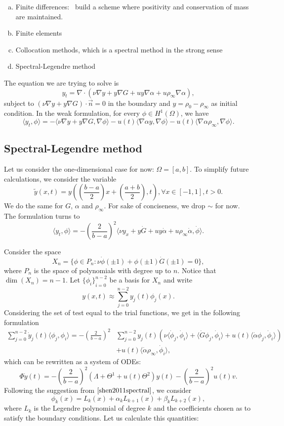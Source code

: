 \documentclass[12pt]{article}
\newcommand{\n}{\vec{n}}
\newcommand{\steady}{\rho_{\infty}}
\newcommand{\inner}[2]{\langle{} #1, #2 \rangle{}}
\theoremstyle{definition}
\begin{document}
\begin{enumerate}[(a)]
    \item Finite differences:~\cite{chang1970practical} build a scheme where positivity and conservation of mass are maintained.
    \item Finite elements
    \item Collocation methods, which is a spectral method in the strong sense
    \item Spectral-Legendre method
\end{enumerate}

The equation we are trying to solve is 
\[
y_t = \nabla \cdot (\nu \nabla y + y \nabla G + u y \nabla \alpha + u \steady \nabla \alpha),
\]
subject to $(\nu \nabla y + y \nabla G) \cdot \n = 0$ in the boundary and $y = \rho_0 - \steady$ as initial condition.
In the weak formulation, for every $\phi \in H^1(\Omega)$, we have
\[
\inner{y_t}{\phi} = -\inner{\nu \nabla y + y \nabla G}{\nabla \phi} - u(t)\inner{\nabla \alpha y}{\nabla \phi} - u(t)\inner{ \nabla \alpha \steady}{\nabla \phi}.
\]

\subsection{Spectral-Legendre method}

Let us consider the one-dimensional case for now: $\Omega = [a,b]$.
To simplify future calculations, we consider the variable
\[
\tilde{y}(x,t) = y\left(\left(\frac{b-a}{2}\right)x + \left(\frac{a+b}{2}\right), t\right), \forall x \in [-1,1], t > 0.    
\]
We do the same for $G$, $\alpha$ and $\steady$. 
For sake of conciseness, we drop $\sim$ for now.
The formulation turns to 
\[
\inner{y_t}{\phi} = - {\left(\frac{2}{b-a}\right)}^2\inner{\nu y_x + y \dot{G} + u y \dot{\alpha} + u\steady \dot{\alpha}}{\dot{\phi}}.
\]

Consider the space 
\[
X_n = \{\phi \in P_n : \nu \dot{\phi}(\pm 1) + \phi(\pm 1) \dot{G}(\pm 1) = 0\},
\]
where $P_n$ is the space of polynomials with degree up to $n$.
Notice that $\dim(X_n) = n-1$.
Let ${\{\phi_i\}}_{i=0}^{n-2}$ be a basis for $X_n$ and write 
\[
y(x,t) \approx \sum_{j=0}^{n-2} y_j(t) \phi_j(x). 
\]
Considering the set of test equal to the trial functions, we get in the following formulation
\[
\begin{split}
    \sum_{j=0}^{n-2} \dot{y}_j(t) \inner{\phi_j}{\phi_i} = -{\left(\frac{2}{b-a}\right)}^2 &\sum_{j=0}^{n-2} y_j(t) \left(\nu \inner{\dot{\phi}_j}{\dot{\phi}_i} + \inner{\dot{G} \phi_j}{\dot{\phi}_i} + u(t)\inner{\dot{\alpha}\phi_j}{\dot{\phi}_i} \right) \\ 
    &+ u(t) \inner{\dot{\alpha} \steady}{\dot{\phi}_i},
\end{split}
\]
which can be rewritten as a system of ODEs:
\[
\Phi \dot{y}(t) = -{\left(\frac{2}{b-a}\right)}^2 (\Lambda + \Theta^1 + u(t)\Theta^2)y(t) - {\left(\frac{2}{b-a}\right)}^2u(t)v.    
\]
Following the suggestion from $\cite[p.7]{shen2011spectral}$, we consider
\[
\phi_k(x) = L_k(x) + \alpha_k L_{k+1}(x) + \beta_k L_{k+2}(x),    
\]
where $L_k$ is the Legendre polynomial of degree $k$ and the coefficients chosen as to satisfy the boundary conditions. 
Let us calculate this quantities:
\end{document}
